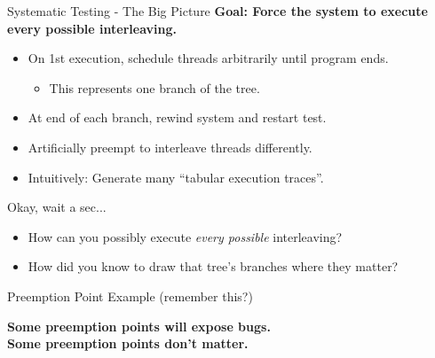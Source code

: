 \documentclass[xcolor=dvipsnames]{beamer}
\begin{document}

\begin{frame}{Systematic Testing - The Big Picture}
	\textbf{Goal: Force the system to execute every possible interleaving.}
	\begin{itemize}
		\item On 1st execution, schedule threads arbitrarily until program ends.
			\begin{itemize}
				\item This represents one branch of the tree.
			\end{itemize}
		\item At end of each branch, rewind system and restart test.
		\item Artificially preempt to interleave threads differently.
		\item Intuitively: Generate many ``tabular execution traces''.
	\end{itemize}
	\pause
	\linegap

	Okay, wait a sec...
	\pause
	\begin{itemize}
		\item How can you possibly execute {\em every possible} interleaving?
		\item How did you know to draw that tree's branches where they matter?
	\end{itemize}
\end{frame}

\begin{frame}{Preemption Point Example (remember this?)}
	\linegap

	{\bf Some preemption points will expose bugs. \\
	Some preemption points don't matter.}

\end{frame}
\end{document}
